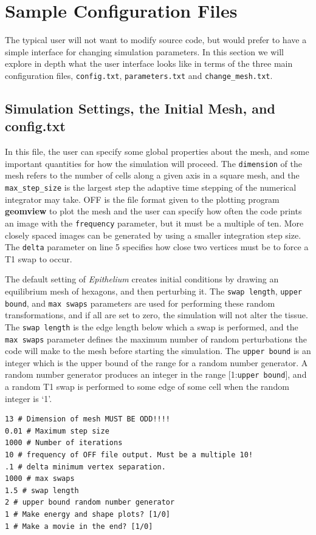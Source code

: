 \section{Sample Configuration Files}
The typical user will not want to modify source code, but would prefer to have a simple interface for changing simulation parameters. In this section we will explore in depth what the user interface looks like in terms of the three main configuration files, \texttt{config.txt}, \texttt{parameters.txt} and \texttt{change\_mesh.txt}.
\subsection{Simulation Settings, the Initial Mesh, and config.txt}
In this file, the user can specify some global properties about the mesh, and some important quantities for how the simulation will proceed. The \texttt{dimension} of the mesh refers to the number of cells along a given axis in a square mesh, and the \texttt{max\_step\_size} is the largest step the adaptive time stepping of the numerical integrator may take. OFF is the file format given to the plotting program \textbf{geomview} to plot the mesh and the user can specify how often the code prints an image with the \texttt{frequency} parameter, but it must be a multiple of ten. More closely spaced images can be generated by using a smaller integration step size. The \texttt{delta} parameter on line 5 specifies how close two vertices must be to force a T1 swap to occur.

The default setting of \emph{Epithelium} creates initial conditions by drawing an equilibrium mesh of hexagons, and then perturbing it.
The \texttt{swap length}, \texttt{upper bound}, and \texttt{max swaps} parameters are used for performing these random transformations, and if all are set to zero, the simulation will not alter the tissue. The \texttt{swap length} is the edge length below which a swap is performed, and the \texttt{max swaps} parameter defines the maximum number of random perturbations the code will make to the mesh before starting the simulation. The \texttt{upper bound} is an integer which is the upper bound of the range for a random number generator. A random number generator produces an integer in the range [1:\texttt{upper bound}], and a random T1 swap is performed to some edge of some cell when the random integer is `1'. 

\begin{lstlisting}
13 # Dimension of mesh MUST BE ODD!!!!
0.01 # Maximum step size
1000 # Number of iterations
10 # frequency of OFF file output. Must be a multiple 10!
.1 # delta minimum vertex separation.
1000 # max swaps
1.5 # swap length
2 # upper bound random number generator
1 # Make energy and shape plots? [1/0]
1 # Make a movie in the end? [1/0]
\end{lstlisting}

